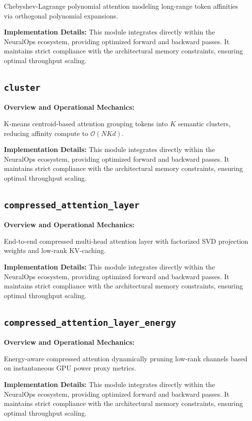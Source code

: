 \documentclass[10pt,twocolumn,letterpaper]{article}
\begin{document}
Chebyshev-Lagrange polynomial attention modeling long-range token affinities via orthogonal polynomial expansions.

\textbf{Implementation Details:}
This module integrates directly within the NeuralOps ecosystem, providing optimized forward and backward passes. It maintains strict compliance with the architectural memory constraints, ensuring optimal throughput scaling.

\subsection{\texttt{cluster}}
\textbf{Overview and Operational Mechanics:}

K-means centroid-based attention grouping tokens into $K$ semantic clusters, reducing affinity compute to $\mathcal{O}(N K d)$.

\textbf{Implementation Details:}
This module integrates directly within the NeuralOps ecosystem, providing optimized forward and backward passes. It maintains strict compliance with the architectural memory constraints, ensuring optimal throughput scaling.

\subsection{\texttt{compressed\_attention\_layer}}
\textbf{Overview and Operational Mechanics:}

End-to-end compressed multi-head attention layer with factorized SVD projection weights and low-rank KV-caching.

\textbf{Implementation Details:}
This module integrates directly within the NeuralOps ecosystem, providing optimized forward and backward passes. It maintains strict compliance with the architectural memory constraints, ensuring optimal throughput scaling.

\subsection{\texttt{compressed\_attention\_layer\_energy}}
\textbf{Overview and Operational Mechanics:}

Energy-aware compressed attention dynamically pruning low-rank channels based on instantaneous GPU power proxy metrics.

\textbf{Implementation Details:}
This module integrates directly within the NeuralOps ecosystem, providing optimized forward and backward passes. It maintains strict compliance with the architectural memory constraints, ensuring optimal throughput scaling.
\end{document}
